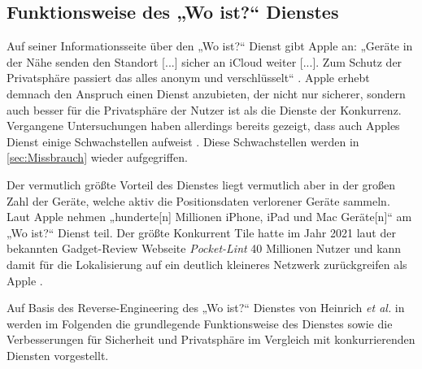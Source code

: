 \subsection{Funktionsweise des „Wo ist?“ Dienstes}
\label{sec:Funktionsweise_FindMy}
Auf seiner Informationsseite über den „Wo ist?“ Dienst gibt Apple an: „Geräte in der Nähe senden den Standort [...] sicher an iCloud weiter [...]. Zum Schutz der Privatsphäre passiert das alles anonym und verschlüsselt“ \cite{Apple_WoIst}.
Apple erhebt demnach den Anspruch einen Dienst anzubieten, der nicht nur sicherer, sondern auch besser für die Privatsphäre der Nutzer ist als die Dienste der Konkurrenz.
Vergangene Untersuchungen haben allerdings bereits gezeigt, dass auch Apples Dienst einige Schwachstellen aufweist \cite{Heinrich_FindMy,Tonetto_FindMy}.
Diese Schwachstellen werden in \autoref{sec:Missbrauch} wieder aufgegriffen.

Der vermutlich größte Vorteil des Dienstes liegt vermutlich aber in der großen Zahl der Geräte, welche aktiv die Positionsdaten verlorener Geräte sammeln.
Laut Apple nehmen „hunderte[n] Millionen iPhone, iPad und Mac Geräte[n]“ \cite{Apple_WoIst} am „Wo ist?“ Dienst teil.
Der größte Konkurrent Tile hatte im Jahr 2021 laut der bekannten Gadget-Review Webseite \textit{Pocket-Lint} 40 Millionen Nutzer und kann damit für die Lokalisierung auf ein deutlich kleineres Netzwerk zurückgreifen als Apple \cite{Tile_Network}.


Auf Basis des Reverse-Engineering des „Wo ist?“ Dienstes von Heinrich \textit{et al.} in \cite{Heinrich_FindMy} werden im Folgenden die grundlegende Funktionsweise des Dienstes sowie die Verbesserungen für Sicherheit und Privatsphäre im Vergleich mit konkurrierenden Diensten vorgestellt.





